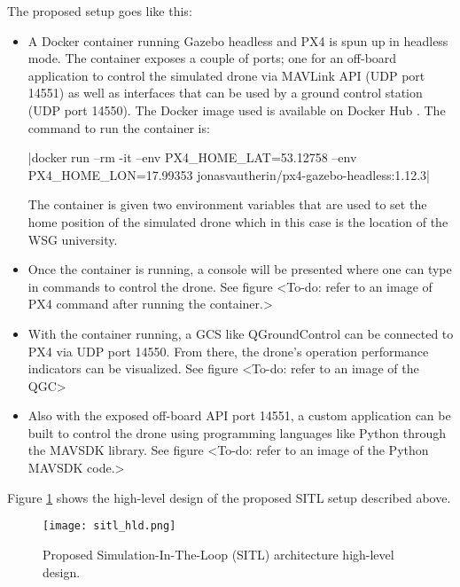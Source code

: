 The proposed setup goes like this:

\begin{itemize}
    \item A Docker container running Gazebo headless and PX4 is spun up in headless mode. The container exposes a couple of ports; one for an off-board application to control the simulated drone via MAVLink API (UDP port 14551) as well as interfaces that can be used by a ground control station (UDP port 14550). The Docker image used is available on Docker Hub \cite{px4gazeboheadlesssitldockerimage}. The command to run the container is:

          |docker run --rm -it --env PX4_HOME_LAT=53.12758 --env PX4_HOME_LON=17.99353 jonasvautherin/px4-gazebo-headless:1.12.3|

          The container is given two environment variables that are used to set the home position of the simulated drone which in this case is the location of the WSG university.
    \item Once the container is running, a console will be presented where one can type in commands to control the drone. See figure <To-do: refer to an image of PX4 command after running the container.>
    \item With the container running, a GCS like QGroundControl can be connected to PX4 via UDP port 14550. From there, the drone's operation performance indicators can be visualized. See figure <To-do: refer to an image of the QGC>
    \item Also with the exposed off-board API port 14551, a custom application can be built to control the drone using programming languages like Python through the MAVSDK library. See figure <To-do: refer to an image of the Python MAVSDK code.>
\end{itemize}

Figure \ref{fig:sitl-hld} shows the high-level design of the proposed SITL setup described above.

\begin{figure}[H]
    \centering \texttt{[image: sitl\_hld.png]}
    \caption{Proposed Simulation-In-The-Loop (SITL) architecture high-level design.}
    \label{fig:sitl-hld}
\end{figure}



